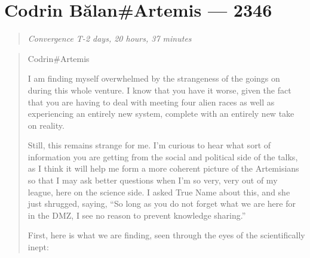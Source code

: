 \hypertarget{codrin-bux103lanartemis-2346}{%
\chapter{Codrin Bălan\#Artemis — 2346}\label{codrin-bux103lanartemis-2346}}

\begin{quote}
\emph{Convergence T-2 days, 20 hours, 37 minutes}
\end{quote}

\begin{quote}
Codrin\#Artemis

I am finding myself overwhelmed by the strangeness of the goings on during this whole venture. I know that you have it worse, given the fact that you are having to deal with meeting four alien races as well as experiencing an entirely new system, complete with an entirely new take on reality.

Still, this remains strange for me. I'm curious to hear what sort of information you are getting from the social and political side of the talks, as I think it will help me form a more coherent picture of the Artemisians so that I may ask better questions when I'm so very, very out of my league, here on the science side. I asked True Name about this, and she just shrugged, saying, ``So long as you do not forget what we are here for in the DMZ, I see no reason to prevent knowledge sharing.''

First, here is what we are finding, seen through the eyes of the scientifically inept:


\end{quote}
